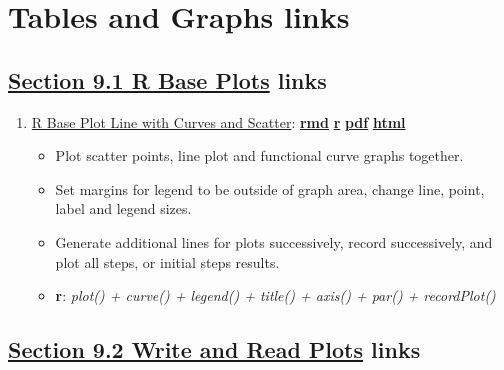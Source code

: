 \documentclass[
]{book}
\providecommand{\tightlist}{%
  \setlength{\itemsep}{0pt}\setlength{\parskip}{0pt}}
\begin{document}
\hypertarget{tables-and-graphs-links}{%
\section{Tables and Graphs links}\label{tables-and-graphs-links}}

\hypertarget{section-9.1-r-base-plotsr-base-plots-links}{%
\subsection{\texorpdfstring{\protect\hyperlink{r-base-plots}{Section 9.1 R Base Plots} links}{Section 9.1 R Base Plots links}}\label{section-9.1-r-base-plotsr-base-plots-links}}

\begin{enumerate}
\def\labelenumi{\arabic{enumi}.}
\tightlist
\item
  \href{https://fanwangecon.github.io/R4Econ/tabgraph/baseplot/htmlpdfr/fs_base_curve.html}{R Base Plot Line with Curves and Scatter}: \href{https://github.com/FanWangEcon/R4Econ/blob/master/tabgraph/baseplot//fs_base_curve.Rmd}{\textbf{rmd}} \textbar{} \href{https://github.com/FanWangEcon/R4Econ/blob/master/tabgraph/baseplot/htmlpdfr/fs_base_curve.R}{\textbf{r}} \textbar{} \href{https://github.com/FanWangEcon/R4Econ/blob/master/tabgraph/baseplot/htmlpdfr/fs_base_curve.pdf}{\textbf{pdf}} \textbar{} \href{https://fanwangecon.github.io/R4Econ/tabgraph/baseplot/htmlpdfr/fs_base_curve.html}{\textbf{html}}

  \begin{itemize}
  \tightlist
  \item
    Plot scatter points, line plot and functional curve graphs together.
  \item
    Set margins for legend to be outside of graph area, change line, point, label and legend sizes.
  \item
    Generate additional lines for plots successively, record successively, and plot all steps, or initial steps results.
  \item
    \textbf{r}: \emph{plot() + curve() + legend() + title() + axis() + par() + recordPlot()}
  \end{itemize}
\end{enumerate}

\hypertarget{section-9.2-write-and-read-plotswrite-and-read-plots-links}{%
\subsection{\texorpdfstring{\protect\hyperlink{write-and-read-plots}{Section 9.2 Write and Read Plots} links}{Section 9.2 Write and Read Plots links}}\label{section-9.2-write-and-read-plotswrite-and-read-plots-links}}
\end{document}
